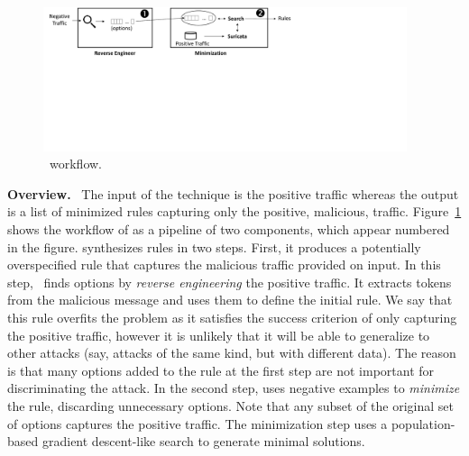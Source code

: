 \documentclass[runningheads]{llncs}
\begin{document}
\begin{figure}[t]
\centering
\includegraphics[trim=0 300 350 0,clip,width=0.95\textwidth]{figs/nids-workflow}
\caption{\tname\ workflow.}
\label{fig:overview}
\end{figure}

\vspace{1ex}
\noindent\textbf{Overview.}~ The input of the technique is the
positive traffic whereas the output is a list of minimized rules
capturing only the positive, malicious,
traffic. Figure~\ref{fig:overview} shows the workflow of \tname{} as a
pipeline of two components, which appear numbered in the figure.
\tname{} synthesizes rules in two steps. First, it produces a
potentially overspecified rule that captures the malicious traffic
provided on input. In this step, \tname\ finds options by
\emph{reverse engineering} the positive traffic. It extracts tokens
from the malicious message and uses them to define the initial
rule. We say that this rule overfits the problem as it satisfies the
success criterion of only capturing the positive traffic, however it
is unlikely that it will be able to generalize to other attacks (say,
attacks of the same kind, but with different data). The reason is that
many options added to the rule at the first step are not important for
discriminating the attack. In the second step, \tname{} uses negative
examples to \emph{minimize} the rule, discarding unnecessary
options. Note that any subset of the original set of options captures
the positive traffic. The minimization step uses a population-based
gradient descent-like search to generate minimal solutions.





\end{document}
